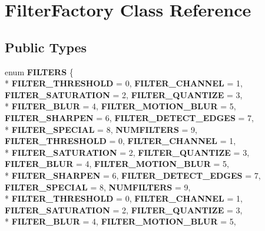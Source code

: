 \hypertarget{classFilterFactory}{\section{Filter\-Factory Class Reference}
\label{classFilterFactory}
}
\subsection*{Public Types}
\begin{DoxyCompactItemize}
\item 
enum {\bfseries F\-I\-L\-T\-E\-R\-S} \{ \\*
{\bfseries F\-I\-L\-T\-E\-R\-\_\-\-T\-H\-R\-E\-S\-H\-O\-L\-D} = 0, 
{\bfseries F\-I\-L\-T\-E\-R\-\_\-\-C\-H\-A\-N\-N\-E\-L} = 1, 
{\bfseries F\-I\-L\-T\-E\-R\-\_\-\-S\-A\-T\-U\-R\-A\-T\-I\-O\-N} = 2, 
{\bfseries F\-I\-L\-T\-E\-R\-\_\-\-Q\-U\-A\-N\-T\-I\-Z\-E} = 3, 
\\*
{\bfseries F\-I\-L\-T\-E\-R\-\_\-\-B\-L\-U\-R} = 4, 
{\bfseries F\-I\-L\-T\-E\-R\-\_\-\-M\-O\-T\-I\-O\-N\-\_\-\-B\-L\-U\-R} = 5, 
{\bfseries F\-I\-L\-T\-E\-R\-\_\-\-S\-H\-A\-R\-P\-E\-N} = 6, 
{\bfseries F\-I\-L\-T\-E\-R\-\_\-\-D\-E\-T\-E\-C\-T\-\_\-\-E\-D\-G\-E\-S} = 7, 
\\*
{\bfseries F\-I\-L\-T\-E\-R\-\_\-\-S\-P\-E\-C\-I\-A\-L} = 8, 
{\bfseries N\-U\-M\-F\-I\-L\-T\-E\-R\-S} = 9, 
{\bfseries F\-I\-L\-T\-E\-R\-\_\-\-T\-H\-R\-E\-S\-H\-O\-L\-D} = 0, 
{\bfseries F\-I\-L\-T\-E\-R\-\_\-\-C\-H\-A\-N\-N\-E\-L} = 1, 
\\*
{\bfseries F\-I\-L\-T\-E\-R\-\_\-\-S\-A\-T\-U\-R\-A\-T\-I\-O\-N} = 2, 
{\bfseries F\-I\-L\-T\-E\-R\-\_\-\-Q\-U\-A\-N\-T\-I\-Z\-E} = 3, 
{\bfseries F\-I\-L\-T\-E\-R\-\_\-\-B\-L\-U\-R} = 4, 
{\bfseries F\-I\-L\-T\-E\-R\-\_\-\-M\-O\-T\-I\-O\-N\-\_\-\-B\-L\-U\-R} = 5, 
\\*
{\bfseries F\-I\-L\-T\-E\-R\-\_\-\-S\-H\-A\-R\-P\-E\-N} = 6, 
{\bfseries F\-I\-L\-T\-E\-R\-\_\-\-D\-E\-T\-E\-C\-T\-\_\-\-E\-D\-G\-E\-S} = 7, 
{\bfseries F\-I\-L\-T\-E\-R\-\_\-\-S\-P\-E\-C\-I\-A\-L} = 8, 
{\bfseries N\-U\-M\-F\-I\-L\-T\-E\-R\-S} = 9, 
\\*
{\bfseries F\-I\-L\-T\-E\-R\-\_\-\-T\-H\-R\-E\-S\-H\-O\-L\-D} = 0, 
{\bfseries F\-I\-L\-T\-E\-R\-\_\-\-C\-H\-A\-N\-N\-E\-L} = 1, 
{\bfseries F\-I\-L\-T\-E\-R\-\_\-\-S\-A\-T\-U\-R\-A\-T\-I\-O\-N} = 2, 
{\bfseries F\-I\-L\-T\-E\-R\-\_\-\-Q\-U\-A\-N\-T\-I\-Z\-E} = 3, 
\\*
{\bfseries F\-I\-L\-T\-E\-R\-\_\-\-B\-L\-U\-R} = 4, 
{\bfseries F\-I\-L\-T\-E\-R\-\_\-\-M\-O\-T\-I\-O\-N\-\_\-\-B\-L\-U\-R} = 5, 

\end{DoxyCompactItemize}
